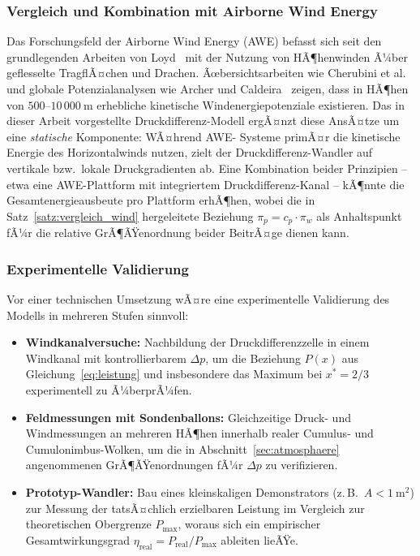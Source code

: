 ﻿\documentclass[a4paper,12pt]{article}
\theoremstyle{definition}
\begin{document}
\subsubsection{Vergleich und Kombination mit Airborne Wind Energy}

Das Forschungsfeld der Airborne Wind Energy (AWE) befasst sich seit den
grundlegenden Arbeiten von Loyd~\cite{loyd1980} mit der Nutzung von
HÃ¶henwinden Ã¼ber geflesselte TragflÃ¤chen und Drachen. Ãœbersichtsarbeiten
wie Cherubini et al.~\cite{cherubini2015} und globale Potenzialanalysen
wie Archer und Caldeira~\cite{archer2009} zeigen, dass in HÃ¶hen von
$500$--$10\,000\ \mathrm{m}$ erhebliche kinetische Windenergiepotenziale
existieren. Das in dieser Arbeit vorgestellte Druckdifferenz-Modell
ergÃ¤nzt diese AnsÃ¤tze um eine \emph{statische} Komponente: WÃ¤hrend AWE-
Systeme primÃ¤r die kinetische Energie des Horizontalwinds nutzen, zielt
der Druckdifferenz-Wandler auf vertikale bzw.\ lokale Druckgradienten ab.
Eine Kombination beider Prinzipien -- etwa eine AWE-Plattform mit
integriertem Druckdifferenz-Kanal -- kÃ¶nnte die Gesamtenergieausbeute pro
Plattform erhÃ¶hen, wobei die in Satz~\ref{satz:vergleich_wind}
hergeleitete Beziehung $\pi_p = c_p \cdot \pi_w$ als Anhaltspunkt fÃ¼r die
relative GrÃ¶ÃŸenordnung beider BeitrÃ¤ge dienen kann.

\subsubsection{Experimentelle Validierung}

Vor einer technischen Umsetzung wÃ¤re eine experimentelle Validierung des
Modells in mehreren Stufen sinnvoll:
\begin{itemize}
	\item \textbf{Windkanalversuche:} Nachbildung der
	Druckdifferenzzelle in einem Windkanal mit kontrollierbarem
	$\Delta p$, um die Beziehung $P(x)$ aus Gleichung~\eqref{eq:leistung}
	und insbesondere das Maximum bei $x^\ast = 2/3$ experimentell zu
	Ã¼berprÃ¼fen.
	\item \textbf{Feldmessungen mit Sondenballons:} Gleichzeitige Druck-
	und Windmessungen an mehreren HÃ¶hen innerhalb realer Cumulus- und
	Cumulonimbus-Wolken, um die in Abschnitt~\ref{sec:atmosphaere}
	angenommenen GrÃ¶ÃŸenordnungen fÃ¼r $\Delta p$ zu verifizieren.
	\item \textbf{Prototyp-Wandler:} Bau eines kleinskaligen
	Demonstrators (z.\,B.\ $A < 1\ \mathrm{m^2}$) zur Messung der
	tatsÃ¤chlich erzielbaren Leistung im Vergleich zur theoretischen
	Obergrenze $P_{\max}$, woraus sich ein empirischer
	Gesamtwirkungsgrad $\eta_{\mathrm{real}} = P_{\mathrm{real}} /
	P_{\max}$ ableiten lieÃŸe.
\end{itemize}
\end{document}
